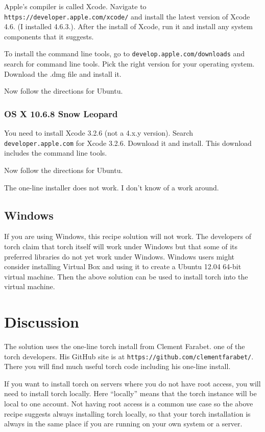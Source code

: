 \documentclass{article}
\let\code\texttt %
\begin{document}
Apple's compiler is called Xcode. Navigate to
\code{https://developer.apple.com/xcode/} and install  the latest
version of Xcode 4.6. (I installed 4.6.3.). After the install of Xcode,
run it and install any system components that it suggests.

To install the command line tools, go to
\code{develop.apple.com/downloads} and search for command line tools.
Pick the right version for your operating system. Download the .dmg file
and install it.

Now follow the directions for Ubuntu.



\subsubsection{OS X 10.6.8 Snow Leopard}


You need to install Xcode 3.2.6 (not a 4.x.y version). Search
\code{developer.apple.com} for Xcode 3.2.6. Download it and install.
This download includes the command line tools.

Now follow the directions for Ubuntu.

The one-line installer does not work. I don't know of a work around.

\subsection{Windows}

If you are using Windows, this recipe solution will not work. The
developers of torch claim that torch itself will work under Windows but
that some of its preferred libraries do not yet work under Windows.
Windows users might consider installing Virtual Box and using it to
create a Ubuntu 12.04 64-bit virtual machine. Then the above solution
can be used to install torch into the virtual machine.

\section{Discussion}

The solution uses the one-line torch install from Clement Farabet. one
of the torch developers. His GitHub site is at
\code{https://github.com/clementfarabet/}. There you will find much
useful torch code including his one-line install.


If you want to install torch on servers where you do not have root
access, you will need to install torch locally. Here ``locally'' means
that the torch instance will be local to one account. Not having root
access is a common use case so the above recipe suggests always
installing torch locally, so that your torch installation is always in
the same place if you are running on your own system or a server.
\end{document}
